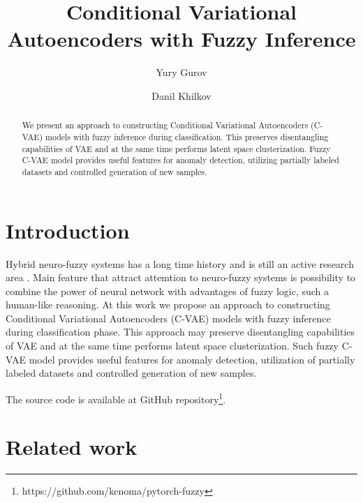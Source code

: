 \documentclass[runningheads]{llncs}
\begin{document}
%
\title{Conditional Variational Autoencoders with Fuzzy Inference}
%
\author{Yury Gurov \and
Danil Khilkov}
%
%
\maketitle              %
%
\begin{abstract}
We present an approach to constructing Conditional Variational Autoencoders (C-VAE) models with fuzzy inference during classification.
This preserves disentangling capabilities of VAE and at the same time performs latent space clusterization.
Fuzzy C-VAE model provides useful features for anomaly detection, utilizing partially labeled datasets and controlled generation of new samples.
%
\end{abstract}
%
%
%
\section{Introduction}

Hybrid neuro-fuzzy systems has a long time history and is still an active research area \cite{DECAMPOSSOUZA2020106275}.
Main feature that attract attemtion to neuro-fuzzy systems is possibility to combine the power of neural network with advantages of fuzzy logic, such a human-like reasoning.
At this work we propose an approach to constructing Conditional Variational Autoencoders (C-VAE) \cite{kingma2022autoencoding,Kingma_2019,SohnCVAE} models with fuzzy inference during classification phase.
This approach may preserve disentangling capabilities of VAE and at the same time performs latent space clusterization.
Such fuzzy C-VAE model provides useful features for anomaly detection, utilization of partially labeled datasets and controlled generation of new samples.

The source code is available at GitHub repository\footnote{https://github.com/kenoma/pytorch-fuzzy}.

\section{Related work}
\end{document}
